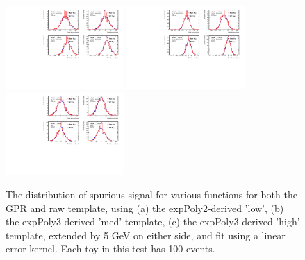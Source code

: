 \begin{figure} 
\begin{center}
  \includegraphics[width=0.4\textwidth]{figures/background/gpr/validation/linear/ToyTest_FitSigVals_lowpT_100_noSig}   
  \includegraphics[width=0.4\textwidth]{figures/background/gpr/validation/linear/ToyTest_FitSigVals_medpT_100_noSig}   
  \includegraphics[width=0.4\textwidth]{figures/background/gpr/validation/linear/ToyTest_FitSigVals_highpT_100_noSig}   
\caption{The distribution of spurious signal for various functions for both the GPR and raw template, using (a) the expPoly2-derived 'low', (b) the expPoly3-derived 'med' template, (c) the expPoly3-derived 'high' template, extended by 5 GeV on either side, and fit using a linear error kernel. Each toy in this test has 100 events.}
\label{fig:linearkernel_lowpt_100_noSig}
\end{center}
\end{figure}

